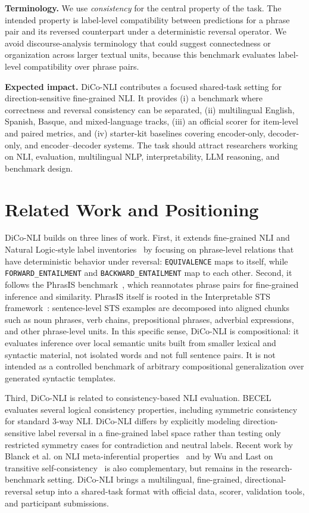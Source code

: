 \documentclass[11pt]{article}
\begin{document}
\medskip
\noindent\textbf{Terminology.}
We use \emph{consistency} for the central property of the task.
The intended property is label-level compatibility between predictions for a phrase pair and its reversed counterpart under a deterministic reversal operator.
We avoid discourse-analysis terminology that could suggest connectedness or organization across larger textual units, because this benchmark evaluates label-level compatibility over phrase pairs.

\medskip
\noindent\textbf{Expected impact.}
DiCo-NLI contributes a focused shared-task setting for direction-sensitive fine-grained NLI.
It provides (i) a benchmark where correctness and reversal consistency can be separated, (ii) multilingual English, Spanish, Basque, and mixed-language tracks, (iii) an official scorer for item-level and paired metrics, and (iv) starter-kit baselines covering encoder-only, decoder-only, and encoder--decoder systems.
The task should attract researchers working on NLI, evaluation, multilingual NLP, interpretability, LLM reasoning, and benchmark design.

\section{Related Work and Positioning}

DiCo-NLI builds on three lines of work.
First, it extends fine-grained NLI and Natural Logic-style label inventories~\cite{maccartney2009natural} by focusing on phrase-level relations that have deterministic behavior under reversal:
\texttt{EQUIVALENCE} maps to itself, while \texttt{FORWARD\_ENTAILMENT} and \texttt{BACKWARD\_ENTAILMENT} map to each other.
Second, it follows the PhrasIS benchmark~\cite{10.1093/jigpal/jzae037}, which reannotates phrase pairs for fine-grained inference and similarity.
PhrasIS itself is rooted in the Interpretable STS framework~\cite{lopezgazpio2017interpretable}: sentence-level STS examples are decomposed into aligned chunks such as noun phrases, verb chains, prepositional phrases, adverbial expressions, and other phrase-level units.
In this specific sense, DiCo-NLI is compositional: it evaluates inference over local semantic units built from smaller lexical and syntactic material, not isolated words and not full sentence pairs.
It is not intended as a controlled benchmark of arbitrary compositional generalization over generated syntactic templates.

Third, DiCo-NLI is related to consistency-based NLI evaluation.
BECEL~\cite{jang2022becel} evaluates several logical consistency properties, including symmetric consistency for standard 3-way NLI.
DiCo-NLI differs by explicitly modeling direction-sensitive label reversal in a fine-grained label space rather than testing only restricted symmetry cases for contradiction and neutral labels.
Recent work by Blanck et al. on NLI meta-inferential properties~\cite{blanck2026reverse} and by Wu and Last on transitive self-consistency~\cite{wu2025transitive} is also complementary, but remains in the research-benchmark setting.
DiCo-NLI brings a multilingual, fine-grained, directional-reversal setup into a shared-task format with official data, scorer, validation tools, and participant submissions.
\end{document}
